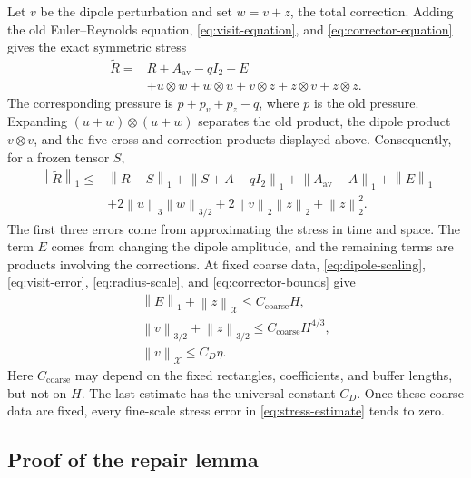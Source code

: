 \documentclass[11pt,a4paper,reqno]{amsart}
\theoremstyle{plain}
\theoremstyle{definition}
\theoremstyle{remark}
\numberwithin{equation}{section}
\newcommand{\X}{\mathcal X}
\newcommand{\norm}[2]{\left\|#1\right\|_{#2}}
\begin{document}
Let $v$ be the dipole perturbation and set $w=v+z$, the total
correction. Adding the old
Euler--Reynolds equation, \eqref{eq:visit-equation}, and
\eqref{eq:corrector-equation} gives the exact symmetric stress
\begin{equation}\label{eq:repaired-stress}
 \begin{aligned}
 \widetilde R={}&R+A_{\mathrm{av}}-qI_2+E\\
 &+u\otimes w+w\otimes u+v\otimes z+z\otimes v+z\otimes z.
 \end{aligned}
\end{equation}
The corresponding pressure is $p+p_v+p_z-q$, where $p$ is the
old pressure. Expanding $(u+w)\otimes(u+w)$ separates the old
product, the dipole product $v\otimes v$, and the five cross and
correction products displayed above.
Consequently, for a frozen tensor $S$,
\begin{equation}\label{eq:stress-estimate}
 \begin{aligned}
 \norm{\widetilde R}1\le{}&
 \norm{R-S}1+\norm{S+A-qI_2}1+
 \norm{A_{\mathrm{av}}-A}1+\norm E1\\
 &+2\norm u3\norm w{3/2}
        +2\norm v2\norm z2+\norm z2^2.
 \end{aligned}
\end{equation}
The first three errors come from approximating the stress in time
and space. The term $E$ comes from changing the dipole amplitude,
and the remaining terms are products involving the corrections.
At fixed coarse data, \eqref{eq:dipole-scaling},
\eqref{eq:visit-error}, \eqref{eq:radius-scale}, and
\eqref{eq:corrector-bounds} give
\begin{equation}\label{eq:fine-errors}
 \begin{gathered}
 \norm E1+\norm z\X\le C_{\mathrm{coarse}}H,\\
 \norm v{3/2}+\norm z{3/2}\le C_{\mathrm{coarse}}H^{4/3},\\
 \norm v\X\le C_D\eta.
 \end{gathered}
\end{equation}
Here $C_{\mathrm{coarse}}$ may depend on the fixed rectangles,
coefficients, and buffer lengths, but not on $H$. The last estimate has the universal constant
$C_D$. Once these coarse data are fixed, every fine-scale stress error
in \eqref{eq:stress-estimate} tends to zero.

\subsection{Proof of the repair lemma}
\end{document}
